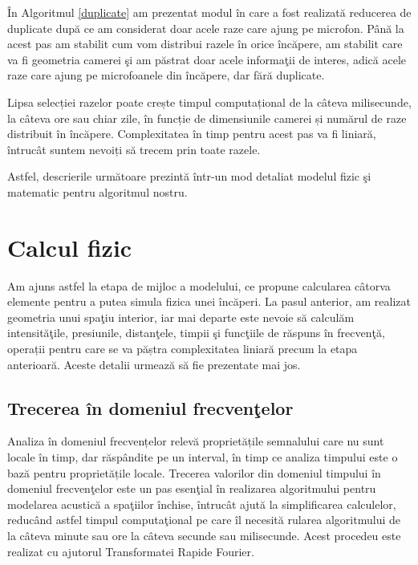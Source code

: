	\^{I}n Algoritmul \ref{duplicate} am prezentat modul \^{i}n care a fost realizat\u{a} reducerea de duplicate dup\u{a} ce am considerat doar acele raze care ajung pe microfon. P\^{a}n\u{a} la acest pas am stabilit cum vom distribui razele \^{i}n orice \^{i}nc\u{a}pere, am stabilit care va fi geometria camerei \c{s}i am p\u{a}strat doar acele informa\c{t}ii de interes, adic\u{a} acele raze care ajung pe microfoanele din \^{i}nc\u{a}pere, dar f\u{a}r\u{a} duplicate. 
	
	Lipsa selecției razelor poate crește timpul computațional de la câteva milisecunde, la câteva ore sau chiar zile, în funcție de dimensiunile camerei și numărul de raze distribuit în încăpere. Complexitatea în timp pentru acest pas va fi liniară, întrucât suntem nevoiți să trecem prin toate razele.
	
	Astfel, descrierile urm\u{a}toare prezint\u{a} \^{i}ntr-un mod detaliat modelul fizic \c{s}i matematic pentru algoritmul nostru.

\section{Calcul fizic}

	Am ajuns astfel la etapa de mijloc a modelului, ce propune calcularea c\^{a}torva elemente pentru a putea simula fizica unei \^{i}nc\u{a}peri. La pasul anterior, am realizat geometria unui spa\c{t}iu interior, iar mai departe este nevoie s\u{a} calcul\u{a}m intensit\u{a}\c{t}ile, presiunile, distan\c{t}ele, timpii \c{s}i func\c{t}iile de r\u{a}spuns \^{i}n frecven\c{t}\u{a}, operații pentru care se va păștra complexitatea liniară precum la etapa anterioară. Aceste detalii urmeaz\u{a} s\u{a} fie prezentate mai jos.
	
\subsection{Trecerea \^{i}n domeniul frecven\c{t}elor}
	
	Analiza în domeniul frecvențelor relevă proprietățile semnalului care nu sunt locale în timp, dar răspândite pe un interval, în timp ce analiza timpului este o bază pentru proprietățile locale. Trecerea valorilor din domeniul timpului \^{i}n domeniul frecven\c{t}elor este un pas esen\c{t}ial \^{i}n realizarea algoritmului pentru modelarea acustic\u{a} a spa\c{t}iilor \^{i}nchise, \^{i}ntruc\^{a}t ajut\u{a} la simplificarea calculelor, reduc\^{a}nd astfel timpul computa\c{t}ional pe care \^{i}l necesit\u{a} rularea algoritmului de la câteva minute sau ore la câteva secunde sau milisecunde. Acest procedeu este realizat cu ajutorul Transformatei Rapide Fourier.
	
